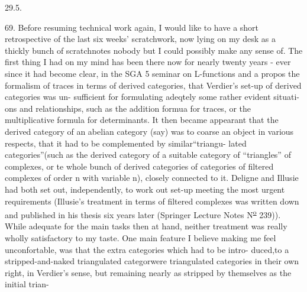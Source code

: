 
29.5.

69. Before resuming   technical work again, I would like to have a
short retrospective of the last six weeks' scratchwork, now lying on my
desk as a thickly bunch of scratchnotes\hand{,} nobody but I could possibly make
any sense of. \hand{//}The first thing I had on my mind has been there now for
nearly twenty years - ever since it had become clear, in the SGA 5
seminar on L-functions and a propos the formalism of traces in terms of
derived categories, that Verdier's set-up of derived categories was un-%
sufficient for formulating adeqtely  some rather evident situati-%
ons\xout{,} and relationships, such as the addition formua for traces, or the
multiplicative formula for determinants. It then became appearant that
the derived category of an abelian category (say) was to coarse an object
in various respects, that it had to be complemented by similar``triangu-%
lated categories''(such as the  derived category of a suitable category
of ``triangles'' of complexes, or te whole bunch of derived categories
of categories of filtered complexes of order n with variable n), closely
connected to it. Deligne and Illusie had both set out, independently,
to work out  set-up meeting the most urgent requirements (Illusie's
treatment in terms of filtered complexes was written down and published
in his thesis six years later (Springer Lecture Notes N\textsuperscript{\underline{o}} 239)). While
adequate for the main tasks then at hand, neither treatment was really
wholly satisfactory to my taste. One main feature I believe making me
feel unconfortable, was that the extra categories which had to be intro-%
duced,to   a stripped-and-naked triangulated categor\hand{,}were
triangulated categories in their own right, in Verdier's sense, but
remaining nearly as stripped  by themselves as the initial trian-%
